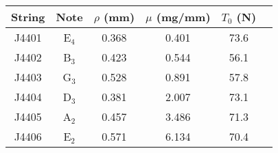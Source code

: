 \begin{tabular}{cccccc}
\toprule
String & Note & $\rho$ (mm) & $\mu$ (mg/mm) & $T_0$ (N) \\
\midrule
J4401 & E$_{4}$ & 0.368 & 0.401 & 73.6 \\
J4402 & B$_{3}$ & 0.423 & 0.544 & 56.1 \\
J4403 & G$_{3}$ & 0.528 & 0.891 & 57.8 \\
J4404 & D$_{3}$ & 0.381 & 2.007 & 73.1 \\
J4405 & A$_{2}$ & 0.457 & 3.486 & 71.3 \\
J4406 & E$_{2}$ & 0.571 & 6.134 & 70.4 \\
\bottomrule
\end{tabular}


